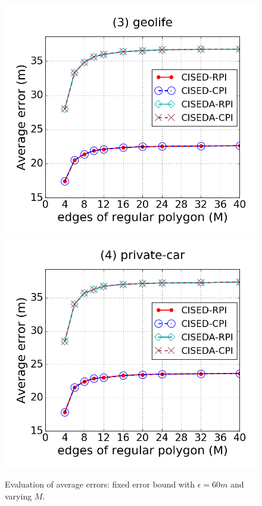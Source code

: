 \begin{figure}[tb!]
\includegraphics[scale = 0.250]{figures/Exp-M-e-60-error-geolife.png}
\includegraphics[scale = 0.250]{figures/Exp-M-e-60-error-private.png}
\vspace{-2ex}
\caption{\small Evaluation of average errors: fixed error bound with $\epsilon = 60m$ and varying $M$.}
\label{fig:m-error-e60}
\vspace{-2ex}
\end{figure}


